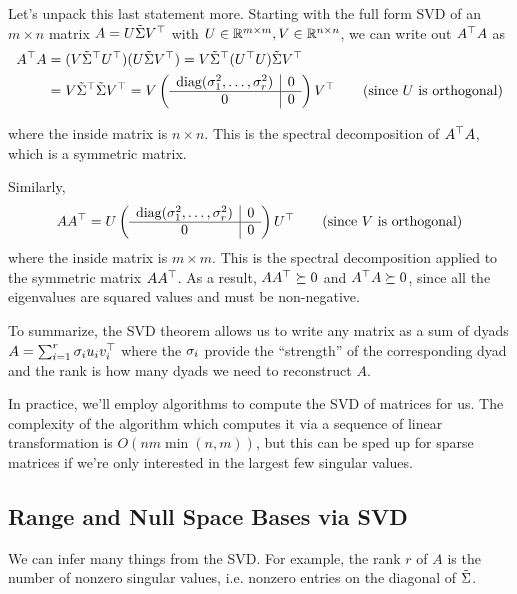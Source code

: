 \documentclass[11 pt]{scrartcl}
\begin{document}
Let's unpack this last statement more. 
Starting with the full form SVD of an $m\times n$ matrix $A = U \tilde{\Sigma} V^\top$ with $U\in \mathbb R^{m\times m}, V\in\mathbb R^{n\times n}$, we can write out $A^\top A$ as 
\begin{align*}
    A^\top A &= (V \tilde{\Sigma}^\top U^\top) (U \tilde{\Sigma} V^\top) =  V \tilde{\Sigma}^\top (U^\top U) \tilde{\Sigma} V^\top \\ 
           &= V\tilde{\Sigma}^\top \tilde{\Sigma} V^\top = V \left(\begin{array}{c|c} \text{diag}(\sigma_1^2, \dots, \sigma_r^2) & 0 \\ \hline 0 & 0 \end{array}\right) V^\top \tag{since $U$ is orthogonal}
\end{align*}

where the inside matrix is $n\times n$. 
This is the spectral decomposition of $A^\top A$, which is a symmetric matrix. 

Similarly, 
\begin{align*}
    A A^\top = U \left(\begin{array}{c|c} \text{diag}(\sigma_1^2, \dots, \sigma_r^2) & 0 \\ \hline 0 & 0 \end{array}\right) U^\top \tag{since $V$ is orthogonal}
\end{align*}
where the inside matrix is $m\times m$. 
This is the spectral decomposition applied to the symmetric matrix $AA^\top$. 
As a result, $AA^\top \succeq 0$ and $A^\top A \succeq 0$, since all the eigenvalues are squared values and must be non-negative.

To summarize, the SVD theorem allows us to write any matrix as a sum of dyads $A = \sum_{i=1}^r \sigma_i u_i v_i^\top$ where the $\sigma_i$ provide the ``strength'' of the corresponding dyad and the rank is how many dyads we need to reconstruct $A$. 

In practice, we'll employ algorithms to compute the SVD of matrices for us.
The complexity of the algorithm which computes it via a sequence of linear transformation is $O(nm\min(n,m))$, but this can be sped up for sparse matrices if we're only interested in the largest few singular values. 

\subsection{Range and Null Space Bases via SVD}
We can infer many things from the SVD. 
For example, the rank $r$ of $A$ is the number of nonzero singular values, i.e. nonzero entries on the diagonal of $\tilde{\Sigma}$. 
\end{document}
